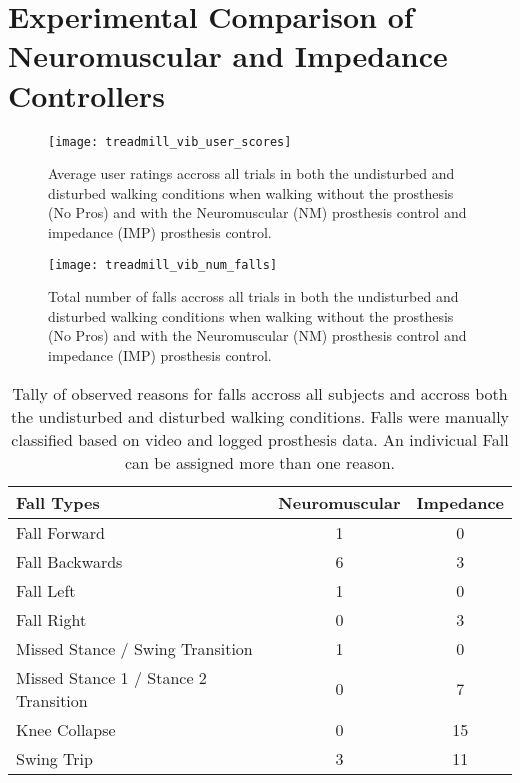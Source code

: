 \chapter{Experimental Comparison of Neuromuscular and Impedance Controllers}\label{sec:nm_vs_imp}

\begin{figure}[h]
    \centering 
    \texttt{[image: treadmill\_vib\_user\_scores]}
    \caption{Average user ratings accross all trials in both the 
    undisturbed and disturbed walking conditions when walking without the
    prosthesis (No Pros) and with the Neuromuscular (NM) prosthesis control and
    impedance (IMP) prosthesis control.}\label{fig:treadmill_user_ratings}
\end{figure}

\begin{figure}[h]
    \centering 
    \texttt{[image: treadmill\_vib\_num\_falls]}
    \caption{Total number of falls accross all trials in both the 
    undisturbed and disturbed walking conditions when walking without the
    prosthesis (No Pros) and with the Neuromuscular (NM) prosthesis control and
    impedance (IMP) prosthesis control.}\label{fig:treadmill_exp_falls}
\end{figure}

\begin{table}[h]
  \footnotesize%
  \begin{center}
    \begin{tabular}{lcc}
      \toprule
      Fall Types & Neuromuscular & Impedance \\
      \midrule
      Fall Forward &  1 &  0 \\
      Fall Backwards &  6 &  3 \\
      Fall Left &  1 &  0 \\
      Fall Right &  0 &  3 \\
      Missed Stance / Swing Transition &  1 &  0 \\
      Missed Stance 1 / Stance 2 Transition &  0 &  7 \\
      Knee Collapse & 0 & 15 \\
      Swing Trip & 3 & 11 \\
      \bottomrule
    \end{tabular}
  \end{center}
  \caption{Tally of observed reasons for falls accross all subjects and accross
  both the undisturbed and disturbed walking conditions. Falls were manually
  classified based on video and logged prosthesis data. An indivicual Fall can
  be assigned more than one reason.}\label{tab:treadmill_exp_fall_reasons}
\end{table}
